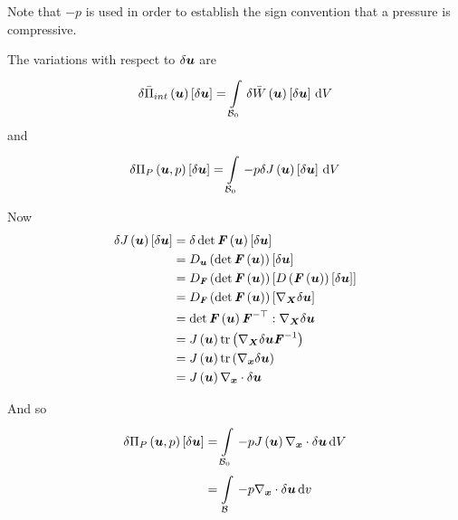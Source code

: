 Note that $-p$ is used in order to establish the sign convention that a
pressure is compressive.

The variations with respect to $  \delta   \boldsymbol{u}  $ are
\begin{equation}
  \variation{\fnof{\bar{\Pi}_{int}}{\vectr{u}}}{\vectr{u}}=\gint{\embedmanifold{B}_{0}}{}{\variation{\fnof{\bar{W}}{\vectr{u}}}{\vectr{u}}}{V}
\end{equation}
and
\begin{equation}
  \variation{\fnof{\Pi_{P}}{\vectr{u},p}}{\vectr{u}}=\gint{\embedmanifold{B}_{0}}{}{-p\variation{\fnof{J}{\vect{u}}}{\vectr{u}}}{V}
\end{equation}

Now
\begin{equation}
  \begin{split}
    \variation{\fnof{J}{\vectr{u}}}{\vectr{u}}&=\variation{\determinant{\fnof{\tensor{F}}{\vectr{u}}}}{\vectr{u}}
    \\
    &=\directionalderiv{\vectr{u}}{\determinant{\fnof{\tensor{F}}{\vectr{u}}}}{\variationdir{\vectr{u}}}\\
    &=\directionalderiv{\tensor{F}}{\determinant{\fnof{\tensor{F}}{\vectr{u}}}}{\directionalderiv{}{\fnof{\tensor{F}}{\vectr{u}}}{\variationdir{\vectr{u}}}}
    \\
    &=\directionalderiv{\tensor{F}}{\determinant{\fnof{\tensor{F}}{\vectr{u}}}}{\gradient{\vectr{X}}{\variationdir{\vectr{u}}}}
    \\
    &=
    \determinant{\fnof{\tensor{F}}{\vectr{u}}}\doubledotprod{\invtranspose{\tensor{F}}}{\gradient{\vectr{X}}{\variationdir{\vectr{u}}}}\\
    &=\fnof{J}{\vectr{u}}\trop\pbrac{\gradient{\vectr{X}}{\variationdir{\vectr{u}}}\inverse{\tensor{F}}}
    \\
    &= \fnof{J}{\vectr{u}}\trop\pbrac{\gradient{\vectr{x}}{\variationdir{\vectr{u}}}}\\
    &=\fnof{J}{\vectr{u}}\divergence{\vectr{x}}{\variationdir{\vectr{u}}}
  \end{split}
\end{equation}

And so
\begin{equation}
  \begin{split}
    \variation{\fnof{\Pi_{P}}{\vectr{u},p}}{\vectr{u}}&=\gint{\embedmanifold{B}_{0}}{}{-p\fnof{J}{\vectr{u}}\divergence{\vectr{x}}{\variationdir{\vectr{u}}}}{V}\\
    &=\gint{\embedmanifold{B}}{}{-p\divergence{\vectr{x}}{\variationdir{\vectr{u}}}}{v}\\
  \end{split}
\end{equation}

